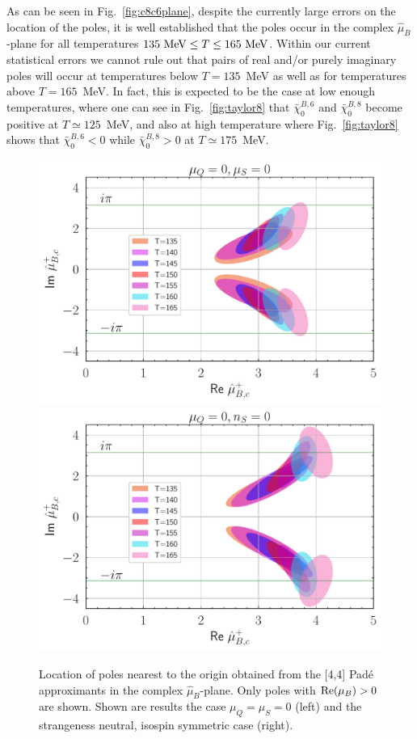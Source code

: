 \documentclass[pdflatex,prd,twocolumn,showpacs,superscriptaddress,nofootinbib]{revtex4-1}
\newcommand \hmu {\hat{\mu}}
\newcommand \cb {\bar{\chi}}
\begin{document}
As can be seen in Fig.~\ref{fig:c8c6plane},  despite the currently large errors on the location of the poles, it is well established  that the poles occur in
the complex $\hmu_B$-plane for all temperatures $135~{\rm MeV}\le T\le 165~{\rm MeV}$. 
Within our current statistical errors we cannot rule out that
pairs of real and/or purely imaginary poles will occur at
temperatures below $T=135$~MeV as well as for temperatures above $T=165$~MeV. 
In fact, this is expected to be the case at low enough temperatures, where one can see in Fig.~\ref{fig:taylor8} that $\cb_0^{B,6}$ and 
$\cb_0^{B,8}$ become positive at $T\simeq 125$~MeV, and also at high
temperature where Fig.~\ref{fig:taylor8} shows that $\cb_0^{B,6} < 0$ while $\cb_0^{B,8}>0$ at $T\simeq 175$~MeV.

\begin{figure}[t]
	\begin{center}
\includegraphics[scale=0.42]{fig/poles_muQ_muS_zero.pdf}
	\includegraphics[scale=0.42]{fig/poles_muQ_zero_strangeness_neutral.pdf}

\end{center}
\caption{Location of poles nearest to the origin obtained from the [4,4] Pad\'e approximants  in the complex $\hmu_B$-plane. Only poles with ${\rm Re} (\mu_B)>0$ are shown. Shown are results the case $\mu_Q=\mu_S=0$ (left) and the strangeness neutral, isospin symmetric case (right).
}
\label{fig:mupoles}
\end{figure}
\end{document}
